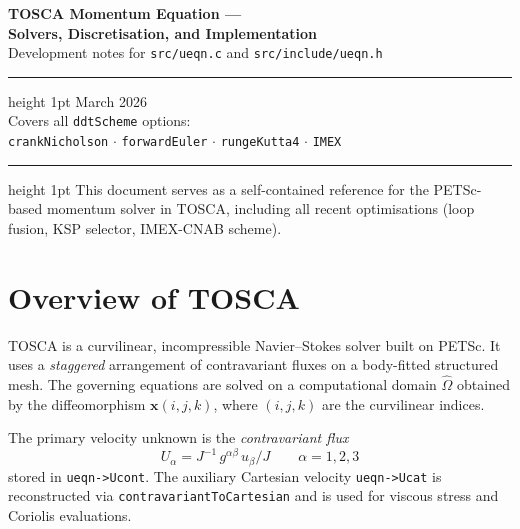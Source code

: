 \documentclass[12pt,a4paper]{article}
\begin{document}
	
	\begin{titlepage}
		\centering
		\vspace*{2cm}
		{\LARGE\bfseries\color{tosca-blue} TOSCA Momentum Equation ---\\[0.4em]
			Solvers, Discretisation, and Implementation}\\[1.5em]
		{\large Development notes for \texttt{src/ueqn.c} and \texttt{src/include/ueqn.h}}\\[3em]
		\hrule height 1pt
		\vspace{1em}
		{\large March 2026}\\[0.5em]
		{\normalsize Covers all \texttt{ddtScheme} options:\\
			\texttt{crankNicholson} $\cdot$ \texttt{forwardEuler} $\cdot$
			\texttt{rungeKutta4} $\cdot$ \texttt{IMEX}}
		\vspace{1em}
		\hrule height 1pt
		\vfill
		{\small This document serves as a self-contained reference for the
			PETSc-based momentum solver in TOSCA, including all recent
			optimisations (loop fusion, KSP selector, IMEX-CNAB scheme).}
	\end{titlepage}
	
	\tableofcontents
	\clearpage
	
	\section{Overview of TOSCA}
	
	TOSCA is a curvilinear, incompressible Navier--Stokes solver built on PETSc.
	It uses a \emph{staggered} arrangement of contravariant fluxes on a
	body-fitted structured mesh. The governing equations are solved on a
	computational domain $\hat\Omega$ obtained by the diffeomorphism
	$\bm{x}(i,j,k)$, where $(i,j,k)$ are the curvilinear indices.
	
	The primary velocity unknown is the \emph{contravariant flux}
	\begin{equation}
		U_\alpha = J^{-1}\, g^{\alpha\beta}\, u_\beta / J
		\qquad \alpha = 1,2,3
	\end{equation}
	stored in \texttt{ueqn->Ucont}.
	The auxiliary Cartesian velocity \texttt{ueqn->Ucat}
	is reconstructed via \texttt{contravariantToCartesian} and
	is used for viscous stress and Coriolis evaluations.
	
\end{document}
